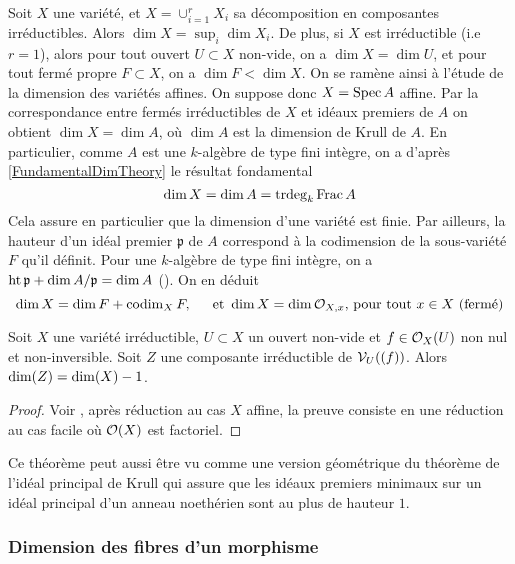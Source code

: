 Soit $X$ une variété, et $X=\cup_{i=1}^rX_i$ sa décomposition en composantes irréductibles. Alors $\dim X=\sup_i \dim X_i$. De plus, si $X$ est irréductible (i.e $r=1$), alors pour tout ouvert $U\subset X$ non-vide, on a $\dim X=\dim U$, et pour tout fermé propre $F\subset X$, on a $\dim F<\dim X$. On se ramène ainsi à l'étude de la dimension des variétés affines. On suppose donc $X=\operatorname{Spec} A$ affine. Par la correspondance entre fermés irréductibles de $X$ et idéaux premiers de $A$ on obtient $\dim X= \dim A$, où $\dim A$ est la dimension de Krull de $A$. En particulier, comme $A$ est une $k$-algèbre de type fini intègre, on a d'après \ref{FundamentalDimTheory} le résultat fondamental
$$\dim X=\dim A=\operatorname{trdeg}_k \operatorname{Frac} A$$
Cela assure en particulier que la dimension d'une variété est finie. Par ailleurs, la hauteur d'un idéal premier $\mathfrak{p}$ de $A$ correspond à la codimension de la sous-variété $F$ qu'il définit. Pour une $k$-algèbre de type fini intègre, on a $\operatorname{ht} \mathfrak{p}+ \dim A/\mathfrak{p}=\dim A$ (\cite[13.4]{Eisenbud}). On en déduit
$$\dim X=\dim F+\operatorname{codim}_X F,\,\,\,\,\,\,\, \text{ et } \dim X=\dim\mathcal{O}_{X,x} \text{, pour tout } x\in X \text{ (fermé)}$$

\begin{thm}\label{dimsousvariete}
Soit $X$ une variété irréductible, $U\subset X$ un ouvert non-vide et $f\in \mathcal{O}_X(U)$ non nul et non-inversible. Soit $Z$ une composante irréductible de $\mathcal{V}_U((f))$. Alors $\operatorname{dim}(Z)= \operatorname{dim}(X)-1$.
\end{thm}
\begin{proof}
Voir \cite[I.7 Th.2]{MumfordRedBook}, après réduction au cas $X$ affine, la preuve consiste en une réduction au cas facile où $\mathcal{O}(X)$ est factoriel. 
\end{proof}

Ce théorème peut aussi être vu comme une version géométrique du théorème de l'idéal principal de Krull qui assure que les idéaux premiers minimaux sur un idéal principal d'un anneau noethérien sont au plus de hauteur $1$.

\subsubsection{Dimension des fibres d'un morphisme}

